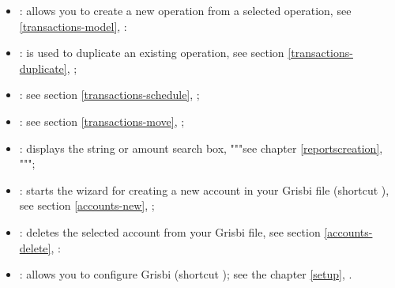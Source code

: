 \begin{itemize}
	\item {}: allows you to create a new operation from a selected operation, see \vref{transactions-model}, :
	\item {}: is used to duplicate an existing operation, see section \vref{transactions-duplicate}, ;
	\item {}: see section \vref{transactions-schedule}, ;
	\item {}: see section \vref{transactions-move}, ;
	\item {}: displays the string or amount search box, """see chapter \vref{reportscreation}, """;%
	\item {}: starts the wizard for creating a new account in your Grisbi file (shortcut ), see section \vref{accounts-new}, ;
	\item {}: deletes the selected account from your Grisbi file, see section \vref{accounts-delete}, :
	\item {}: allows you to configure Grisbi (shortcut ); see the chapter \vref{setup}, .
\end{itemize}

